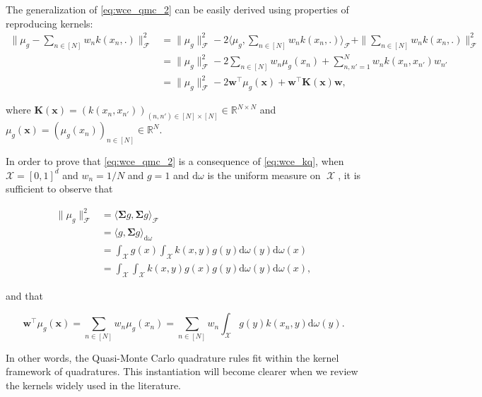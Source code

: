 \documentclass[twoside,11pt]{book}
\DeclareMathOperator{\Tran}{\intercal}
\DeclareMathOperator{\X}{\mathcal{X}}
\begin{document}
The generalization of \eqref{eq:wce_qmc_2} can be easily derived using properties of reproducing kernels:
\begin{align}
\|\mu_{g} - \sum\limits_{n \in [N]}w_{n} k(x_{n},.) \|_{\mathcal{F}}^{2} & = \|\mu_{g}\|_{\mathcal{F}}^{2} - 2 \langle \mu_{g}, \sum\limits_{n \in [N]}w_{n} k(x_{n},.)  \rangle_{\mathcal{F}} + \|\sum\limits_{n \in [N]}w_{n} k(x_{n},.)\|_{\mathcal{F}}^{2}\\
& = \|\mu_{g}\|_{\mathcal{F}}^{2} - 2 \sum\limits_{n \in [N]} w_{n} \mu_{g}(x_{n}) + \sum\limits_{n,n'=1}^{N}w_{n}k(x_{n},x_{n'})w_{n'}\\
& \label{eq:wce_kq}= \|\mu_{g}\|_{\mathcal{F}}^{2} - 2 \bm{w}^{\Tran} \mu_{g}(\bm{x}) + \bm{w}^{\Tran} \bm{K}(\bm{x})\bm{w},
\end{align}

where $\bm{K}(\bm{x}) = (k(x_{n},x_{n'}))_{(n,n') \in [N] \times [N]} \in \mathbb{R}^{N \times N}$ and $\mu_{g}(\bm{x}) = (\mu_{g}(x_{n}))_{n \in [N]} \in \mathbb{R}^{N}$.


In order to prove that \eqref{eq:wce_qmc_2} is a consequence of \eqref{eq:wce_kq}, when $\mathcal{X} = [0,1]^{d}$ and $w_{n}=1/N$ and $g=1$ and $\mathrm{d}\omega$ is the uniform measure on $\X$, it is sufficient to observe that

\begin{align}
\|\mu_{g}\|_{\mathcal{F}}^{2} & = \langle \bm{\Sigma} g,\bm{\Sigma} g \rangle_{\mathcal{F}}\\
& = \langle g, \bm{\Sigma} g \rangle_{\mathrm{d}\omega}\\
& = \int_{\mathcal{X}} g(x) \int_{\mathcal{X}} k(x,y) g(y)\mathrm{d}\omega(y) \mathrm{d}\omega(x)\\
& = \int_{\mathcal{X}} \int_{\mathcal{X}} k(x,y) g(x) g(y)\mathrm{d}\omega(y) \mathrm{d}\omega(x),
\end{align}

and that

\begin{equation}
\bm{w}^{\Tran} \mu_{g}(\bm{x}) = \sum\limits_{n \in [N]} w_{n}\mu_{g}(x_{n}) = \sum\limits_{n \in [N]} w_{n}\int_{\mathcal{X}}g(y)k(x_{n},y) \mathrm{d}\omega(y).
\end{equation}


In other words, the Quasi-Monte Carlo quadrature rules fit within the kernel framework of quadratures. This instantiation will become clearer when we review the kernels widely used in the literature.
\end{document}
